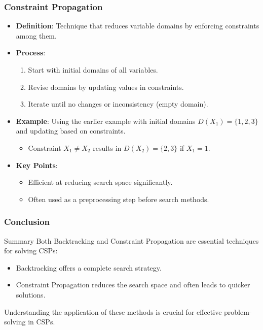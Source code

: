 \documentclass[aspectratio=169]{beamer}
\begin{document}
\begin{frame}[fragile]
    \frametitle{Constraint Propagation}
    \begin{itemize}
        \item \textbf{Definition}: Technique that reduces variable domains by enforcing constraints among them.
        \item \textbf{Process}:
        \begin{enumerate}
            \item Start with initial domains of all variables.
            \item Revise domains by updating values in constraints.
            \item Iterate until no changes or inconsistency (empty domain).
        \end{enumerate}
        \item \textbf{Example}: Using the earlier example with initial domains \(D(X_1) = \{1, 2, 3\}\) and updating based on constraints.
        \begin{itemize}
            \item Constraint \(X_1 \neq X_2\) results in \(D(X_2) = \{2, 3\}\) if \(X_1 = 1\).
        \end{itemize}
        \item \textbf{Key Points}:
        \begin{itemize}
            \item Efficient at reducing search space significantly.
            \item Often used as a preprocessing step before search methods.
        \end{itemize}
    \end{itemize}
\end{frame}

\begin{frame}[fragile]
    \frametitle{Conclusion}
    \begin{block}{Summary}
        Both Backtracking and Constraint Propagation are essential techniques for solving CSPs:
        \begin{itemize}
            \item Backtracking offers a complete search strategy.
            \item Constraint Propagation reduces the search space and often leads to quicker solutions.
        \end{itemize}
        Understanding the application of these methods is crucial for effective problem-solving in CSPs.
    \end{block}
\end{frame}
\end{document}
